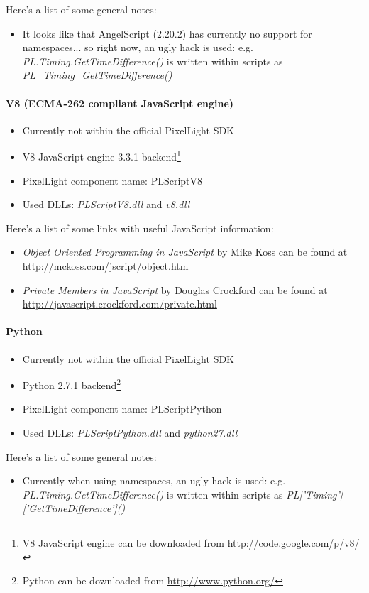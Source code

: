 Here's a list of some general notes:
\begin{itemize}
\item It looks like that AngelScript (2.20.2) has currently no support for namespaces... so right now, an ugly hack is used: e.g. \emph{PL.Timing.GetTimeDifference()} is written within scripts as \emph{PL\_Timing\_GetTimeDifference()}
\end{itemize}


\paragraph{V8 (ECMA-262 compliant JavaScript engine)}
\begin{itemize}
\item Currently not within the official PixelLight \ac{SDK}
\item V8 JavaScript engine 3.3.1 backend\footnote{V8 JavaScript engine can be downloaded from \url{http://code.google.com/p/v8/}}
\item PixelLight component name: PLScriptV8
\item Used \ac{DLL}s: \emph{PLScriptV8.dll} and \emph{v8.dll}
\end{itemize}

Here's a list of some links with useful JavaScript information:
\begin{itemize}
\item \emph{Object Oriented Programming in JavaScript} by Mike Koss  can be found at \url{http://mckoss.com/jscript/object.htm}
\item \emph{Private Members in JavaScript} by Douglas Crockford can be found at \url{http://javascript.crockford.com/private.html}
\end{itemize}


\paragraph{Python}
\begin{itemize}
\item Currently not within the official PixelLight \ac{SDK}
\item Python 2.7.1 backend\footnote{Python can be downloaded from \url{http://www.python.org/}}
\item PixelLight component name: PLScriptPython
\item Used \ac{DLL}s: \emph{PLScriptPython.dll} and \emph{python27.dll}
\end{itemize}

Here's a list of some general notes:
\begin{itemize}
\item Currently when using namespaces, an ugly hack is used: e.g. \emph{PL.Timing.GetTimeDifference()} is written within scripts as \emph{PL['Timing']['GetTimeDifference']()}
\end{itemize}
